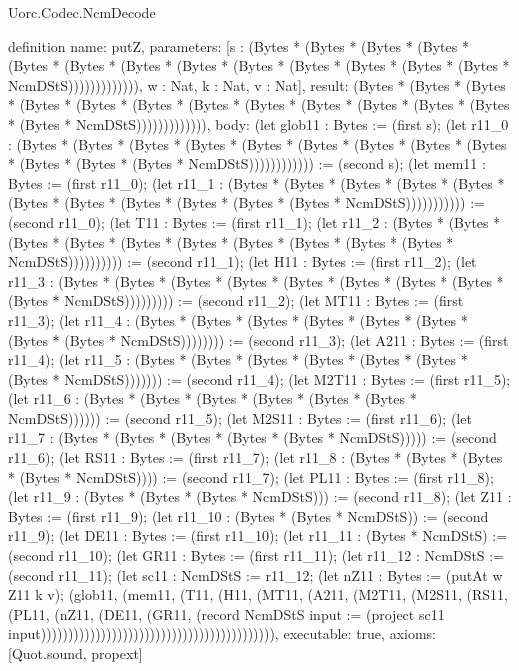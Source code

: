 \begin{lexlean}{Uorc.Codec.NcmDecode}
\begin{semanticmodule}
definition{
  name: putZ,
  parameters: [s : (Bytes * (Bytes * (Bytes * (Bytes * (Bytes * (Bytes * (Bytes * (Bytes * (Bytes * (Bytes * (Bytes * (Bytes * (Bytes * NcmDStS))))))))))))), w : Nat, k : Nat, v : Nat],
  result: (Bytes * (Bytes * (Bytes * (Bytes * (Bytes * (Bytes * (Bytes * (Bytes * (Bytes * (Bytes * (Bytes * (Bytes * (Bytes * NcmDStS))))))))))))),
  body: (let glob11 : Bytes := (first s); (let r11_0 : (Bytes * (Bytes * (Bytes * (Bytes * (Bytes * (Bytes * (Bytes * (Bytes * (Bytes * (Bytes * (Bytes * (Bytes * NcmDStS)))))))))))) := (second s); (let mem11 : Bytes := (first r11_0); (let r11_1 : (Bytes * (Bytes * (Bytes * (Bytes * (Bytes * (Bytes * (Bytes * (Bytes * (Bytes * (Bytes * (Bytes * NcmDStS))))))))))) := (second r11_0); (let T11 : Bytes := (first r11_1); (let r11_2 : (Bytes * (Bytes * (Bytes * (Bytes * (Bytes * (Bytes * (Bytes * (Bytes * (Bytes * (Bytes * NcmDStS)))))))))) := (second r11_1); (let H11 : Bytes := (first r11_2); (let r11_3 : (Bytes * (Bytes * (Bytes * (Bytes * (Bytes * (Bytes * (Bytes * (Bytes * (Bytes * NcmDStS))))))))) := (second r11_2); (let MT11 : Bytes := (first r11_3); (let r11_4 : (Bytes * (Bytes * (Bytes * (Bytes * (Bytes * (Bytes * (Bytes * (Bytes * NcmDStS)))))))) := (second r11_3); (let A211 : Bytes := (first r11_4); (let r11_5 : (Bytes * (Bytes * (Bytes * (Bytes * (Bytes * (Bytes * (Bytes * NcmDStS))))))) := (second r11_4); (let M2T11 : Bytes := (first r11_5); (let r11_6 : (Bytes * (Bytes * (Bytes * (Bytes * (Bytes * (Bytes * NcmDStS)))))) := (second r11_5); (let M2S11 : Bytes := (first r11_6); (let r11_7 : (Bytes * (Bytes * (Bytes * (Bytes * (Bytes * NcmDStS))))) := (second r11_6); (let RS11 : Bytes := (first r11_7); (let r11_8 : (Bytes * (Bytes * (Bytes * (Bytes * NcmDStS)))) := (second r11_7); (let PL11 : Bytes := (first r11_8); (let r11_9 : (Bytes * (Bytes * (Bytes * NcmDStS))) := (second r11_8); (let Z11 : Bytes := (first r11_9); (let r11_10 : (Bytes * (Bytes * NcmDStS)) := (second r11_9); (let DE11 : Bytes := (first r11_10); (let r11_11 : (Bytes * NcmDStS) := (second r11_10); (let GR11 : Bytes := (first r11_11); (let r11_12 : NcmDStS := (second r11_11); (let sc11 : NcmDStS := r11_12; (let nZ11 : Bytes := (putAt w Z11 k v); (glob11, (mem11, (T11, (H11, (MT11, (A211, (M2T11, (M2S11, (RS11, (PL11, (nZ11, (DE11, (GR11, (record NcmDStS {input := (project sc11 input)})))))))))))))))))))))))))))))))))))))))))),
  executable: true,
  axioms: [Quot.sound, propext]
}


\end{semanticmodule}
\end{lexlean}
